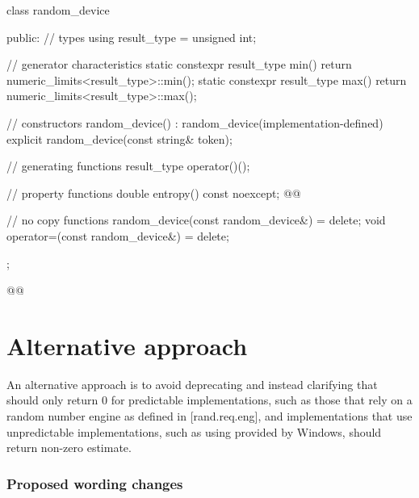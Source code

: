 \documentclass{wg21}
\begin{document}
\begin{codeblock}
    class random_device {
        public:
        // types
        using result_type = unsigned int;
        
        // generator characteristics
        static constexpr result_type min() { return numeric_limits<result_type>::min(); }
        static constexpr result_type max() { return numeric_limits<result_type>::max(); }
        
        // constructors
        random_device() : random_device(implementation-defined) {}
        explicit random_device(const string& token);
        
        // generating functions
        result_type operator()();
        
        // property functions
        double entropy() const noexcept;
        @@
        
        // no copy functions
        random_device(const random_device&) = delete;
        void operator=(const random_device&) = delete;
    };
\end{codeblock}

\begin{codeblock}
@@
\end{codeblock}

\begin{itemdescr}
\end{itemdescr}



\hypertarget{alternative-approach}{%
    \section{Alternative approach}\label{alternative-approach}}

An alternative approach is to avoid deprecating 
and instead clarifying that  should only
return 0 for predictable implementations, such as those that rely on a
random number engine as defined in [rand.req.eng], and implementations
that use unpredictable implementations, such as using 
provided by Windows, should return non-zero estimate.



\hypertarget{entropy-query-wording}{%
    \subsubsection{Proposed wording changes}\label{entropy-query-wording}}
\end{document}
